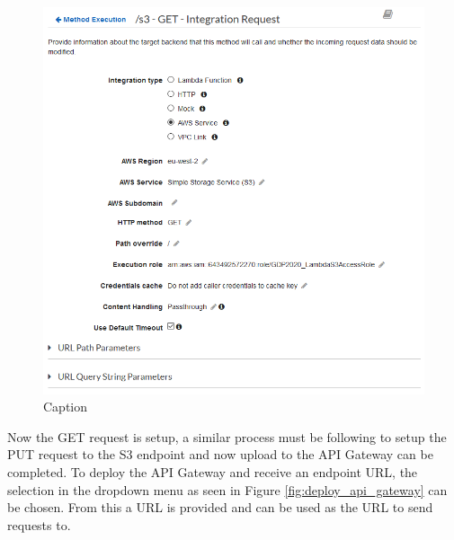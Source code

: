 \begin{figure}[ht]
    \centering
\includegraphics[width=1\linewidth]{pages/Chapter4/Chapter 4 Images/get_method_execution_2.png}
    \caption{Caption}
    \label{fig:integration_request_settings}
\end{figure}

Now the GET request is setup, a similar process must be following to setup the PUT request to the S3 endpoint and now upload to the API Gateway can be completed. To deploy the API Gateway and receive an endpoint URL, the selection in the dropdown menu as seen in Figure \ref{fig:deploy_api_gateway} can be chosen. From this a URL is provided and can be used as the URL to send requests to.

